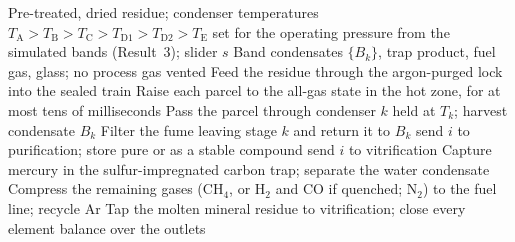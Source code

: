 \begin{algorithmic}[1]
\Require Pre-treated, dried residue; condenser temperatures $T_{\mathrm{A}} > T_{\mathrm{B}} > T_{\mathrm{C}} > T_{\mathrm{D1}} > T_{\mathrm{D2}} > T_{\mathrm{E}}$ set for the operating pressure from the simulated bands (Result~3); slider $s$
\Ensure Band condensates $\{B_k\}$, trap product, fuel gas, glass; no process gas vented
\State Feed the residue through the argon-purged lock into the sealed train
\State Raise each parcel to the all-gas state in the hot zone, for at most tens of milliseconds 
  \State Pass the parcel through condenser $k$ held at $T_k$; harvest condensate $B_k$
  \State Filter the fume leaving stage $k$ and return it to $B_k$
     \State send $i$ to purification; store pure or as a stable compound
    \Else \State send $i$ to vitrification 
    \EndIf
  \EndFor
\EndFor
\State Capture mercury in the sulfur-impregnated carbon trap; separate the water condensate
\State Compress the remaining gases (CH$_4$, or H$_2$ and CO if quenched; N$_2$) to the fuel line; recycle Ar
\State Tap the molten mineral residue to vitrification; close every element balance over the outlets 
\end{algorithmic}
